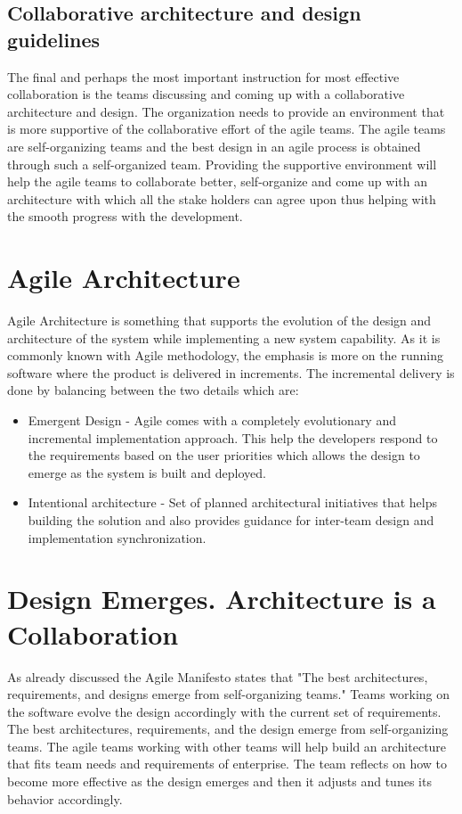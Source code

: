 \documentclass[sigconf]{acmart}
\begin{document}
\subsection {Collaborative architecture and design guidelines}
The final and perhaps the most important instruction for most effective collaboration is the teams discussing and coming up with a collaborative architecture and design. The organization needs to provide an environment that is more supportive of the collaborative effort of the agile teams. The agile teams are self-organizing teams and the best design in an agile process is obtained through such a self-organized team. Providing the supportive environment will help the agile teams to collaborate better, self-organize and come up with an architecture with which all the stake holders can agree upon thus helping with the smooth progress with the development.

\section{Agile Architecture}
Agile Architecture is something that supports the evolution of the design and architecture of the system while implementing a new system capability. As it is commonly known with Agile methodology, the emphasis is more on the running software where the product is delivered in increments. The incremental delivery is done by balancing between the two details which are:

\begin{itemize}
  \item Emergent Design - Agile comes with a completely evolutionary and incremental implementation approach. This help the developers respond to the requirements based on the user priorities which allows the design to emerge as the system is built and deployed. 

  \item Intentional architecture - Set of planned architectural initiatives that helps building the solution and also provides guidance for inter-team design and implementation synchronization.
\end{itemize}

\section{Design Emerges. Architecture is a Collaboration}
As already discussed the Agile Manifesto states that "The best architectures, requirements, and designs emerge from self-organizing teams." Teams working on the software evolve the design accordingly with the current set of requirements. The best architectures, requirements, and the design emerge from self-organizing teams. The agile teams working with other teams will help build an architecture that fits team needs and requirements of enterprise. The team reflects on how to become more effective as the design emerges and then it adjusts and tunes its behavior accordingly.
\end{document}
